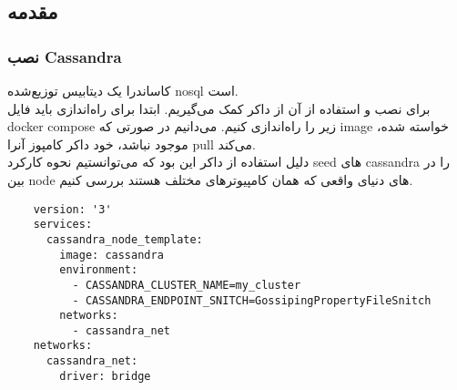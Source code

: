
\subsection{مقدمه}
\subsubsection{نصب Cassandra}
کاساندرا یک دیتابیس توزیع‌شده nosql است.\\
برای نصب و استفاده از آن از داکر کمک می‌گیریم.
ابتدا برای راه‌اندازی باید فایل 
docker compose 
زیر را راه‌اندازی کنیم. می‌دانیم در صورتی که 
image  
خواسته شده، موجود نباشد، خود داکر کامپوز آنرا
pull 
می‌کند.\\
دلیل استفاده از داکر این بود که می‌توانستیم نحوه کارکرد 
seed 
های 
cassandra 
را در بین 
node 
های دنیای واقعی که همان کامپیوترهای مختلف هستند بررسی کنیم.


\begin{latin}
  \begin{verbatim}
    version: '3'
    services:
      cassandra_node_template:
        image: cassandra
        environment:
          - CASSANDRA_CLUSTER_NAME=my_cluster
          - CASSANDRA_ENDPOINT_SNITCH=GossipingPropertyFileSnitch
        networks:
          - cassandra_net
    networks:
      cassandra_net:
        driver: bridge
  \end{verbatim}
\end{latin}

